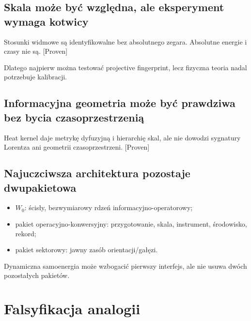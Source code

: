 \documentclass[11pt,a4paper,openany]{report}
\newcommand{\statusProven}{\textcolor{fingreen}{[Proven]}}
\begin{document}
\section{Skala mo\.ze być względna, ale eksperyment wymaga kotwicy}

Stosunki widmowe są identyfikowalne bez absolutnego zegara. Absolutne energie i czasy nie są. \statusProven{}

Dlatego najpierw mo\.zna testować projective fingerprint, lecz fizyczna teoria nadal potrzebuje kalibracji.

\section{Informacyjna geometria mo\.ze być prawdziwa bez bycia czasoprzestrzenią}

Heat kernel daje metrykę dyfuzyjną i hierarchię skal, ale nie dowodzi sygnatury Lorentza ani geometrii czasoprzestrzeni. \statusProven{}

\section{Najuczciwsza architektura pozostaje dwupakietowa}

\begin{itemize}
\item 
\(W_0\): ścisły, bezwymiarowy rdzeń informacyjno-operatorowy;

\item 
pakiet operacyjno-konwersyjny: przygotowanie, skala, instrument, środowisko, rekord;

\item 
pakiet sektorowy: jawny zasób orientacji/\allowbreak{}gałęzi.

\end{itemize}

Dynamiczna samoenergia mo\.ze wzbogacić pierwszy interfejs, ale nie usuwa dwóch pozostałych pakietów.

\chapter{Falsyfikacja analogii}
\end{document}
